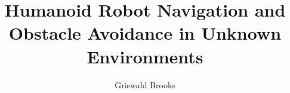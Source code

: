 \documentclass[letterpaper,12pt]{report}
\begin{document}
\title{Humanoid Robot Navigation and Obstacle Avoidance in Unknown Environments}
\author{Griswald Brooks}
\maketitle



\tableofcontents
\listoffigures









\end{document}
